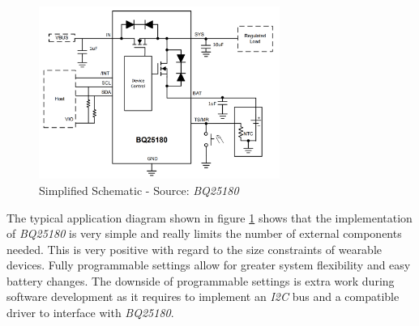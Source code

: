 \documentclass[report.tex]{subfiles}
\begin{document}
\begin{figure}[H]
	\centering
	\includegraphics[width=0.7\textwidth]{Include/Figure/comp/bq25180_simplified_schematic.png}
	\caption{Simplified Schematic - Source: \textit{BQ25180}\cite{bq25180DS}}
	\label{fig:bq25180_simplified_schematic}
\end{figure}

The typical application diagram shown in figure \ref{fig:bq25180_simplified_schematic} shows that the implementation of \textit{BQ25180} is very simple and really limits the number of external components needed. This is very positive with regard to the size constraints of wearable devices. Fully programmable settings allow for greater system flexibility and easy battery changes. The downside of programmable settings is extra work during software development as it requires to implement an \textit{I2C} bus and a compatible driver to interface with \textit{BQ25180}.
\end{document}
